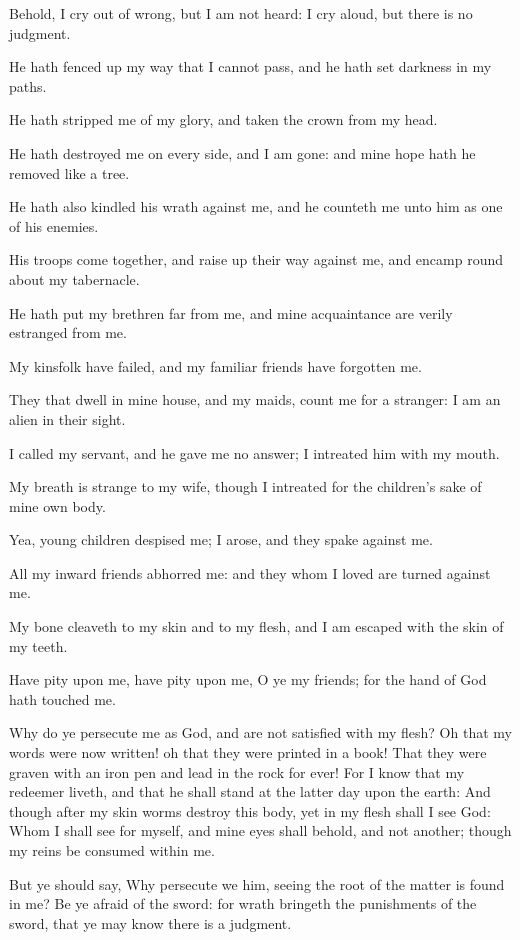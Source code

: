 \Verse Behold, I cry out of wrong, but I am not heard: I cry aloud, but there is no judgment.

\Verse He hath fenced up my way that I cannot pass, and he hath set darkness in my paths.

\Verse He hath stripped me of my glory, and taken the crown from my head.

\Verse He hath destroyed me on every side, and I am gone: and mine hope hath he removed like a tree.

\Verse He hath also kindled his wrath against me, and he counteth me unto him as one of his enemies.

\Verse His troops come together, and raise up their way against me, and encamp round about my tabernacle.

\Verse He hath put my brethren far from me, and mine acquaintance are verily estranged from me.

\Verse My kinsfolk have failed, and my familiar friends have forgotten me.

\Verse They that dwell in mine house, and my maids, count me for a stranger: I am an alien in their sight.

\Verse I called my servant, and he gave me no answer; I intreated him with my mouth.

\Verse My breath is strange to my wife, though I intreated for the children's sake of mine own body.

\Verse Yea, young children despised me; I arose, and they spake against me.

\Verse All my inward friends abhorred me: and they whom I loved are turned against me.

\Verse My bone cleaveth to my skin and to my flesh, and I am escaped with the skin of my teeth.

\Verse Have pity upon me, have pity upon me, O ye my friends; for the hand of God hath touched me.

\Verse Why do ye persecute me as God, and are not satisfied with my flesh?  \Verse Oh that my words were now written! oh that they were printed in a book!  \Verse That they were graven with an iron pen and lead in the rock for ever!  \Verse For I know that my redeemer liveth, and that he shall stand at the latter day upon the earth: \Verse And though after my skin worms destroy this body, yet in my flesh shall I see God: \Verse Whom I shall see for myself, and mine eyes shall behold, and not another; though my reins be consumed within me.

\Verse But ye should say, Why persecute we him, seeing the root of the matter is found in me?  \Verse Be ye afraid of the sword: for wrath bringeth the punishments of the sword, that ye may know there is a judgment.


